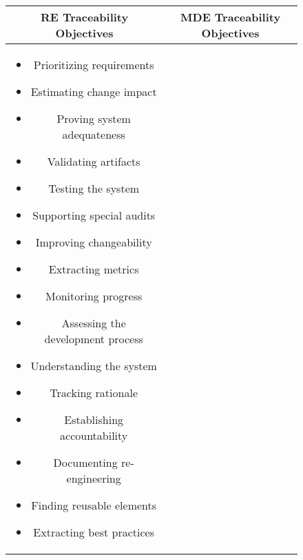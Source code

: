 \begin{figure}
\centering
\begin{tabular}{|c|c|}
\hline
\begin{minipage}[t][][c]{0.5\textwidth}
\centering
\textbf{RE Traceability Objectives}
\end{minipage}

&

\begin{minipage}[t][][c]{0.5\textwidth}
\centering
\textbf{MDE Traceability Objectives}
\end{minipage}

\\\hline

\begin{minipage}[t][][c]{0.5\textwidth}
\vspace{0.1cm}
\begin{itemize}
\renewcommand{\labelitemi}{$\bullet$}

\item Prioritizing requirements 
\item Estimating change impact 
\item Proving system adequateness 
\item Validating artifacts 
\item Testing the system 
\item Supporting special audits 
\item Improving changeability 
\item Extracting metrics 
\item Monitoring progress 
\item Assessing the development process
\item Understanding the system 
\item Tracking rationale 
\item Establishing accountability 
\item Documenting re-engineering 
\item Finding reusable elements 
\item Extracting best practices 

\end{itemize}
\vspace{0.1cm}
\end{minipage}

&

\begin{minipage}[t][][c]{0.5\textwidth}
\vspace{0.1cm}
\begin{itemize}
\renewcommand{\labelitemi}{$\bullet$}


\end{itemize}
\end{minipage}
\end{tabular}
\end{figure}
